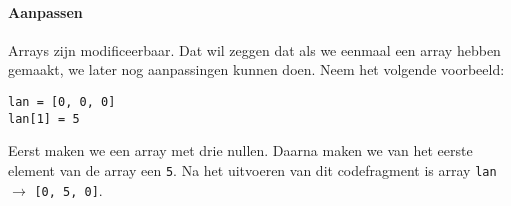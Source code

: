 \paragraph{Aanpassen}
Arrays zijn modificeerbaar. Dat wil zeggen dat als we eenmaal een array hebben gemaakt, we later nog aanpassingen kunnen doen. Neem het volgende voorbeeld:

\begin{verbatim}
lan = [0, 0, 0]
lan[1] = 5
\end{verbatim}

Eerst maken we een array met drie nullen. Daarna maken we van het eerste element van de array een \texttt{5}. Na het uitvoeren van dit codefragment is array \texttt{lan} $\rightarrow$ \texttt{[0, 5, 0]}.
